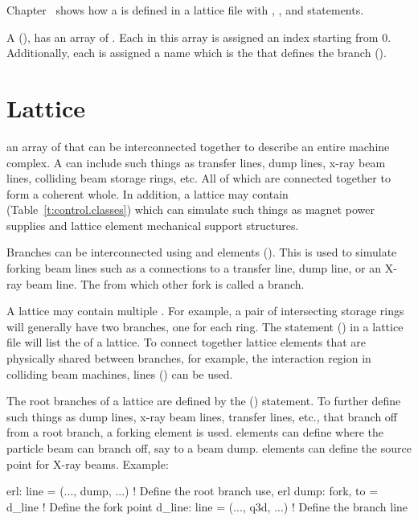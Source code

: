 Chapter~ shows how a  is defined in a
lattice file with , , and  statements.

A  (), has an array of
. Each  in this array is assigned an index
starting from 0. Additionally, each  is assigned a name
which is the  that defines the branch ().

\section{Lattice}
\label{s:lattice.def}

an array of  that can be interconnected together to
describe an entire machine complex. A  can include such
things as transfer lines, dump lines, x-ray beam lines, colliding beam
storage rings, etc. All of which are connected together to form a
coherent whole. In addition, a lattice may contain  (Table~\ref{t:control.classes}) which can simulate such
things as magnet power supplies and lattice element mechanical support
structures.

Branches can be interconnected using  and
 elements (). This is used to
simulate forking beam lines such as a connections
to a transfer line, dump line, or an X-ray beam line. The 
from which other  fork is called a  branch.

A lattice may contain multiple  . For example, a
pair of intersecting storage rings will generally have two 
branches, one for each ring. The  statement () in a
lattice file will list the   of a lattice. To
connect together lattice elements that are physically shared between
branches, for example, the interaction region in colliding beam
machines,  lines () can be used.

The root branches of a lattice are defined by the 
() statement. To further define such things as dump lines,
x-ray beam lines, transfer lines, etc., that branch off from a root
branch, a forking element is used.   elements can define
where the particle beam can branch off, say to a beam
dump.  elements can define the source point for
X-ray beams.  Example:
\begin{example}
  erl: line = (..., dump, ...)               ! Define the root branch 
  use, erl
  dump: fork, to = d_line                    ! Define the fork point
  d_line: line = (..., q3d, ...)             ! Define the branch line
\end{example}

